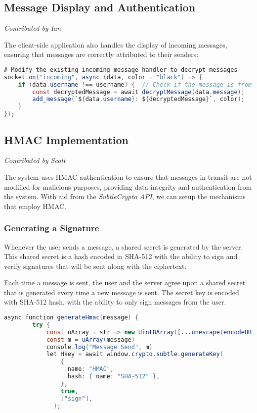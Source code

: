 \documentclass{article}
\begin{document}
\subsection*{Message Display and Authentication}
\textit{Contributed by Ian}

The client-side application also handles the display of incoming messages, ensuring that messages are correctly attributed to their senders:

\begin{lstlisting}[language=Java, caption={Receiving and Decrypting Messages}]
# Modify the existing incoming message handler to decrypt messages
socket.on("incoming", async (data, color = "black") => {
    if (data.username !== username) {  // Check if the message is from another user
        const decryptedMessage = await decryptMessage(data.message);
        add_message(`${data.username}: ${decryptedMessage}`, color);
    }
});
\end{lstlisting}

\subsection*{HMAC Implementation}
\textit{Contributed by Scott}

The system uses HMAC authentication to ensure that messages in transit are not modified for malicious purposes, providing data integrity and authentication from the system. With aid from the \textit{SubtleCrypto API}, we can setup the mechanisms that employ HMAC.

\subsubsection*{Generating a Signature}
Whenever the user sends a message, a shared secret is generated by the server. This shared secret is a hash encoded in SHA-512 with the ability to sign and verify signatures that will be sent along with the ciphertext.

Each time a message is sent, the user and the server agree upon a shared secret that is generated every time a new message is sent. The secret key is encoded with SHA-512 hash, with the ability to only sign messages from the user.

\begin{lstlisting}[language=Java]
    async function generateHmac(message) {
        try {
            const uArray = str => new Uint8Array([...unescape(encodeURIComponent(str))].map(c => c.charCodeAt(0)));
            const m = uArray(message)            
            console.log("Message Send", m)
            let Hkey = await window.crypto.subtle.generateKey(
                {
                  name: "HMAC",
                  hash: { name: "SHA-512" },
                },
                true,
                ["sign"],
              );
\end{lstlisting}
\end{document}
